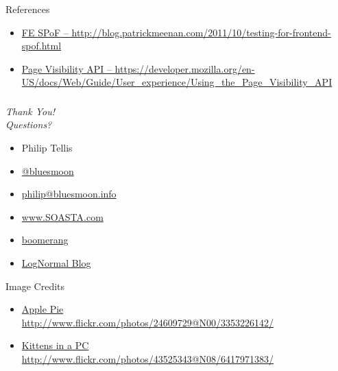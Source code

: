 \documentclass{beamer}
\newcommand{\innersplash}[1]{
  \begin{center}
    \Large \textrm{\textit{ #1 } }
  \end{center}
}
\newcommand{\splashslide}[2][{}]{
  \begin{frame}
  \frametitle{#1}
  \innersplash{#2}
  \end{frame}
}
\begin{document}
\begin{frame}{References}
\begin{itemize}
  \item \tiny \href{http://blog.patrickmeenan.com/2011/10/testing-for-frontend-spof.html}{FE SPoF -- http://blog.patrickmeenan.com/2011/10/testing-for-frontend-spof.html}
  \item \tiny \href{https://developer.mozilla.org/en-US/docs/Web/Guide/User_experience/Using_the_Page_Visibility_API}{Page Visibility API -- https://developer.mozilla.org/en-US/docs/Web/Guide/User\_experience/Using\_the\_Page\_Visibility\_API}
\end{itemize}
\end{frame}

\splashslide{Thank You! \\ Questions?}

\begin{frame}
  \begin{itemize}
  \item Philip Tellis
  \item \href{http://twitter.com/bluesmoon}{@bluesmoon}
  \item \href{http://bluesmoon.info/}{philip@bluesmoon.info}
  \item \href{http://www.soasta.com/}{www.SOASTA.com}
  \item \href{http://lognormal.github.com/boomerang/doc/}{boomerang}
  \item \href{http://www.lognormal.com/blog/}{LogNormal Blog}
  \end{itemize}
\end{frame}

\begin{frame}{Image Credits}
\begin{itemize}
  \item \href{http://www.flickr.com/photos/24609729@N00/3353226142/}{Apple Pie  \\ \small http://www.flickr.com/photos/24609729@N00/3353226142/}
  \item \href{http://www.flickr.com/photos/43525343@N08/6417971383/}{Kittens in a PC  \\ \small http://www.flickr.com/photos/43525343@N08/6417971383/}
\end{itemize}
\end{frame}
\end{document}
